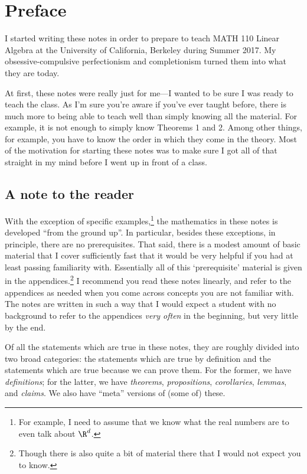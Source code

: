 \chapter*{Preface}


I started writing these notes in order to prepare to teach MATH 110 Linear Algebra at the University of California, Berkeley during Summer 2017.  My obsessive-compulsive perfectionism and completionism turned them into what they are today.

At first, these notes were really just for me---I wanted to be sure I was ready to teach the class.  As I'm sure you're aware if you've ever taught before, there is much more to being able to teach well than simply knowing all the material.  For example, it is not enough to simply know Theorems 1 and 2.  Among other things, for example, you have to know the order in which they come in the theory.  Most of the motivation for starting these notes was to make sure I got all of that straight in my mind before I went up in front of a class.

\section*{A note to the reader}

With the exception of specific examples,\footnote{For example, I need to assume that we know what the real numbers are to even talk about $\R ^d$.} the mathematics in these notes is developed ``from the ground up''.  In particular, besides these exceptions, in principle, there are no prerequisites.  That said, there is a modest amount of basic material that I cover sufficiently fast that it would be very helpful if you had at least passing familiarity with.  Essentially all of this `prerequisite' material is given in the appendices.\footnote{Though there is also quite a bit of material there that I would not expect you to know.}  I recommend you read these notes linearly, and refer to the appendices as needed when you come across concepts you are not familiar with.  The notes are written in such a way that I would expect a student with no background to refer to the appendices \emph{very often} in the beginning, but very little by the end.

Of all the statements which are true in these notes, they are roughly divided into two broad categories:  the statements which are true by definition and the statements which are true because we can prove them.  For the former, we have \emph{definitions}; for the latter, we have \emph{theorems}, \emph{propositions}, \emph{corollaries}, \emph{lemmas}, and \emph{claims}.  We also have ``meta'' versions of (some of) these.

